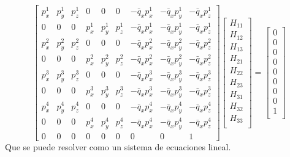 \documentclass[conference]{IEEEtran}
\begin{document}
	\begin{equation*}
	\begin{bmatrix}
	p^1_x & p^1_y & p^1_z & 0 & 0 & 0& -\bar{q}_x p^1_x & -\bar{q}_x p^1_y &-\bar{q}_x p^1_z \\
      0 & 0 & 0 & p^1_x & p^1_y & p^1_z & -\bar{q}_x p^1_x & -\bar{q}_x p^1_y &-\bar{q}_x p^1_z \\

		p^2_x & p^2_y & p^2_z & 0 & 0 & 0& -\bar{q}_x p^2_x & -\bar{q}_x p^2_y &-\bar{q}_x p^2_z \\
      0 & 0 & 0 & p^2_x & p^2_y & p^2_z & -\bar{q}_x p^2_x & -\bar{q}_x p^2_y &-\bar{q}_x p^2_z \\

	p^3_x & p^3_y & p^3_z & 0 & 0 & 0& -\bar{q}_x p^3_x & -\bar{q}_x p^3_y &-\bar{q}_x p^3_z \\
      0 & 0 & 0 & p^3_x & p^3_y & p^3_z & -\bar{q}_x p^3_x & -\bar{q}_x p^3_y &-\bar{q}_x p^3_z \\

	p^4_x & p^4_y & p^4_z & 0 & 0 & 0& -\bar{q}_x p^4_x & -\bar{q}_x p^4_y &-\bar{q}_x p^4_z \\
      0 & 0 & 0 & p^4_x & p^4_y & p^4_z & -\bar{q}_x p^4_x & -\bar{q}_x p^4_y &-\bar{q}_x p^4_z \\
	
	0 & 0 & 0 & 0 & 0 & 0 & 0 & 0 & 1
	\end{bmatrix}
		\begin{bmatrix}
		H_{11} \\
		H_{12} \\
		H_{13} \\
		H_{21} \\
		H_{22} \\
		H_{23} \\
		H_{31} \\
		H_{32} \\
		H_{33} \\
	\end{bmatrix}
	= 
		\begin{bmatrix}
		0 \\
		0 \\
		0 \\
		0 \\
		0 \\
		0 \\
		0 \\
		0 \\
		1 \\
	\end{bmatrix}
	\end{equation*}
	Que se puede resolver como un sistema de ecuaciones lineal.
\end{document}
